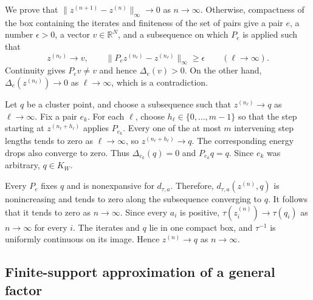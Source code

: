 \documentclass[10pt,a4paper]{amsart}
\newcommand{\R}{\mathbb R}
\begin{document}
We prove that $\|z^{(n+1)}-z^{(n)}\|_\infty\to0$ as $n\to\infty$. Otherwise, compactness of the box containing the iterates and finiteness of the set of pairs give a pair $e$, a number $\epsilon>0$, a vector $v\in\R^N$, and a subsequence on which $P_e$ is applied such that
\[
z^{(n_\ell)}\longrightarrow v,\qquad\|P_ez^{(n_\ell)}-z^{(n_\ell)}\|_\infty\geq\epsilon\qquad(\ell\to\infty).
\]
Continuity gives $P_ev\neq v$ and hence $\Delta_e(v)>0$. On the other hand, $\Delta_e(z^{(n_\ell)})\to0$ as $\ell\to\infty$, which is a contradiction.

Let $q$ be a cluster point, and choose a subsequence such that $z^{(n_\ell)}\to q$ as $\ell\to\infty$. Fix a pair $e_k$. For each $\ell$, choose $h_\ell\in\{0,\ldots,m-1\}$ so that the step starting at $z^{(n_\ell+h_\ell)}$ applies $P_{e_k}$. Every one of the at most $m$ intervening step lengths tends to zero as $\ell\to\infty$, so $z^{(n_\ell+h_\ell)}\to q$. The corresponding energy drops also converge to zero. Thus $\Delta_{e_k}(q)=0$ and $P_{e_k}q=q$. Since $e_k$ was arbitrary, $q\in K_W$.

Every $P_e$ fixes $q$ and is nonexpansive for $d_{\tau,a}$. Therefore, $d_{\tau,a}(z^{(n)},q)$ is nonincreasing and tends to zero along the subsequence converging to $q$. It follows that it tends to zero as $n\to\infty$. Since every $a_i$ is positive, $\tau(z_i^{(n)})\to\tau(q_i)$ as $n\to\infty$ for every $i$. The iterates and $q$ lie in one compact box, and $\tau^{-1}$ is uniformly continuous on its image. Hence $z^{(n)}\to q$ as $n\to\infty$.

\subsection{Finite-support approximation of a general factor}
\label{subsec:app-factor-approximation}
\end{document}
